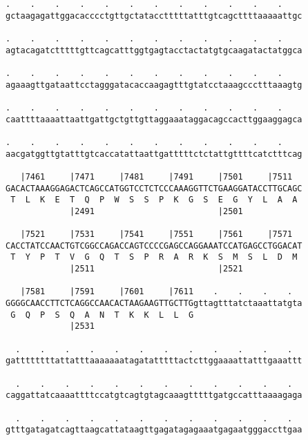 \documentclass{article}
\begin{document}
\begin{Verbatim}
.    .    .    .    .    .    .    .    .    .    .    .    
gctaagagattggacacccctgttgctatacctttttatttgtcagcttttaaaaattgc
                                                            
.    .    .    .    .    .    .    .    .    .    .    .    
agtacagatctttttgttcagcatttggtgagtacctactatgtgcaagatactatggca
                                                            
.    .    .    .    .    .    .    .    .    .    .    .    
agaaagttgataattcctagggatacaccaagagtttgtatcctaaagccctttaaagtg
                                                            
.    .    .    .    .    .    .    .    .    .    .    .    
caattttaaaattaattgattgctgttgttaggaaataggacagccacttggaaggagca
                                                            
.    .    .    .    .    .    .    .    .    .    .    .    
aacgatggttgtatttgtcaccatattaattgatttttctctattgttttcatctttcag
                                                            
   |7461     |7471     |7481     |7491     |7501     |7511  
GACACTAAAGGAGACTCAGCCATGGTCCTCTCCCAAAGGTTCTGAAGGATACCTTGCAGC
 T  L  K  E  T  Q  P  W  S  S  P  K  G  S  E  G  Y  L  A  A 
             |2491                         |2501            
  
   |7521     |7531     |7541     |7551     |7561     |7571  
CACCTATCCAACTGTCGGCCAGACCAGTCCCCGAGCCAGGAAATCCATGAGCCTGGACAT
 T  Y  P  T  V  G  Q  T  S  P  R  A  R  K  S  M  S  L  D  M 
             |2511                         |2521            
  
   |7581     |7591     |7601     |7611    .    .    .    .  
GGGGCAACCTTCTCAGGCCAACACTAAGAAGTTGCTTGgttagtttatctaaattatgta
 G  Q  P  S  Q  A  N  T  K  K  L  L  G                      
             |2531                                          
  
  .    .    .    .    .    .    .    .    .    .    .    .  
gattttttttattatttaaaaaaatagatatttttactcttggaaaattatttgaaattt
                                                            
  .    .    .    .    .    .    .    .    .    .    .    .  
caggattatcaaaattttccatgtcagtgtagcaaagtttttgatgccatttaaaagaga
                                                            
  .    .    .    .    .    .    .    .    .    .    .    .  
gtttgatagatcagttaagcattataagttgagatagagaaatgagaatgggaccttgaa
                                                            

\end{Verbatim}
\end{document}
